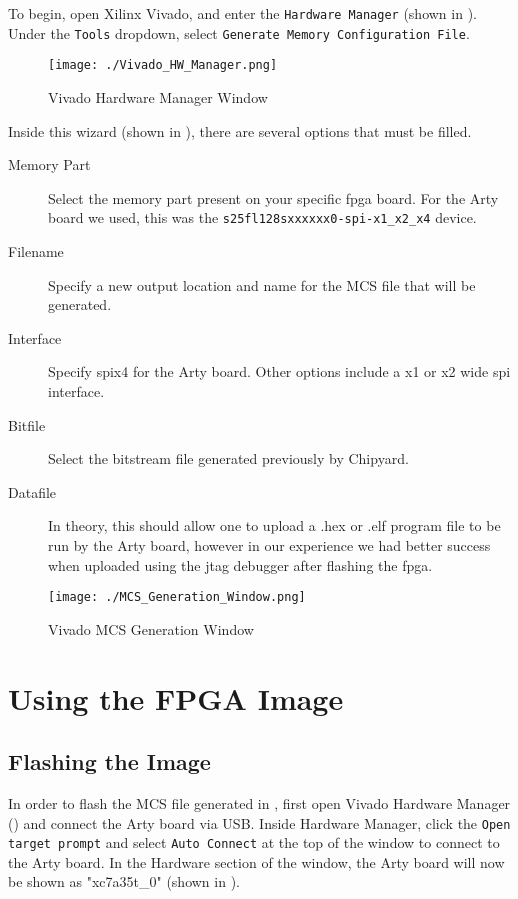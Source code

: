 To begin, open Xilinx Vivado, and enter the \texttt{Hardware Manager} (shown in ).
Under the \texttt{Tools} dropdown, select \texttt{Generate Memory Configuration File}.
\begin{figure}[h!tbp]
  \centering
  \texttt{[image: ./Vivado\_HW\_Manager.png]}
  \caption{Vivado Hardware Manager Window}
  \label{fig:Vivado_HW_Manager}
\end{figure}

Inside this wizard (shown in ), there are several options that must be filled.
\begin{description}
\item[Memory Part] Select the memory part present on your specific \Gls{fpga} board.
  For the Arty board we used, this was the \texttt{s25fl128sxxxxxx0-spi-x1\_x2\_x4} device.
\item[Filename] Specify a new output location and name for the MCS file that will be generated.
\item[Interface] Specify \Gls{spi}x4 for the Arty board. Other options include a x1 or x2 wide \Gls{spi} interface.
\item[Bitfile] Select the bitstream file generated previously by Chipyard.
\item[Datafile] In theory, this should allow one to upload a .hex or .elf program file to be run by the Arty board, however in our experience we had better success when uploaded using the \Gls{jtag} debugger after flashing the \Gls{fpga}.
\end{description}

\begin{figure}[h!tbp]
  \centering
  \texttt{[image: ./MCS\_Generation\_Window.png]}
  \caption{Vivado MCS Generation Window}
  \label{fig:Vivado_MCS_Window}
\end{figure}

\section{Using the FPGA Image}\label{sec:Using_FPGA_Image}
\subsection{Flashing the Image}\label{sec:Flash_FPGA_Image}
In order to flash the MCS file generated in , first open Vivado Hardware Manager () and connect the Arty board via USB.
Inside Hardware Manager, click the \texttt{Open target prompt} and select \texttt{Auto Connect} at the top of the window to connect to the Arty board.
In the Hardware section of the window, the Arty board will now be shown as "xc7a35t\_0" (shown in ).

